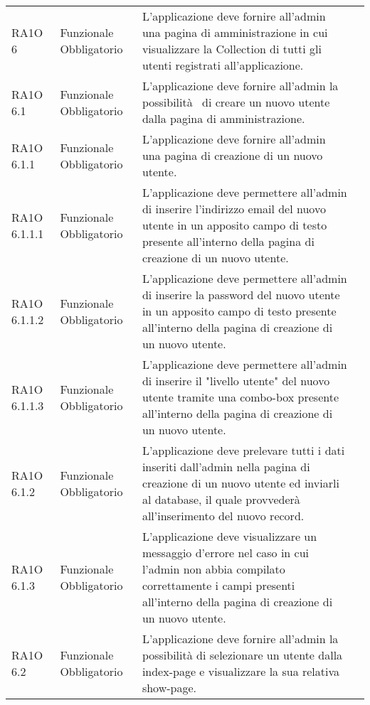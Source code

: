 \begin{center}
\begin{longtable}{ | p{2cm} | p{2cm} | p{5cm} | p{2cm} |}
 &  \\ \hline      
        RA1O 6 & Funzionale \newline  Obbligatorio  & L'applicazione deve fornire all'admin una pagina di amministrazione in cui visualizzare la Collection di tutti gli utenti registrati all'applicazione.
 &  \\ \hline      
        RA1O 6.1  & Funzionale \newline  Obbligatorio  & L'applicazione deve fornire all'admin la possibilità  di creare un nuovo utente dalla pagina di amministrazione. &  \\ \hline      
        RA1O 6.1.1  & Funzionale \newline  Obbligatorio  & L'applicazione deve fornire all'admin una pagina di creazione di un nuovo utente. &  \\ \hline      
        RA1O 6.1.1.1  & Funzionale \newline  Obbligatorio  & L'applicazione deve permettere all'admin di inserire l'indirizzo email del nuovo utente in un apposito campo di testo presente all'interno della pagina di creazione di un nuovo utente.
 &  \\ \hline      
        RA1O 6.1.1.2 & Funzionale \newline  Obbligatorio  & L'applicazione deve permettere all'admin di inserire la password del nuovo utente in un apposito campo di testo presente all'interno della pagina di creazione di un nuovo utente. &  \\ \hline      
        RA1O 6.1.1.3  & Funzionale \newline  Obbligatorio  & L'applicazione deve permettere all'admin di inserire il "livello utente" del nuovo utente tramite una combo-box presente all'interno della pagina di creazione di un nuovo utente. &  \\ \hline      
        RA1O 6.1.2  & Funzionale \newline  Obbligatorio  & L'applicazione deve prelevare tutti i dati inseriti dall'admin nella pagina di creazione di un nuovo utente ed inviarli al database, il quale provvederà  all'inserimento del nuovo record.
 &  \\ \hline      
        RA1O 6.1.3  & Funzionale \newline  Obbligatorio  & L'applicazione deve visualizzare un messaggio d'errore nel caso in cui l'admin non abbia compilato correttamente i campi presenti all'interno della pagina di creazione di un nuovo utente.
 &  \\ \hline      
        RA1O 6.2  & Funzionale \newline  Obbligatorio  & L'applicazione deve fornire all'admin la possibilità di selezionare un utente dalla index-page e visualizzare la sua relativa show-page.

\end{longtable}
\end{center}

